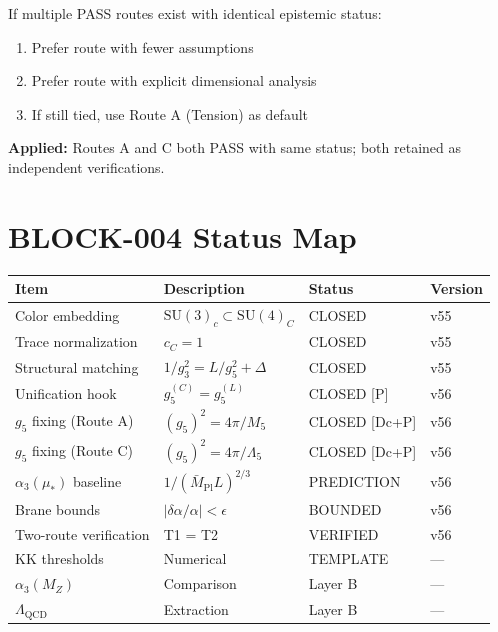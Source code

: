 \documentclass[11pt,a4paper]{article}
\theoremstyle{definition}
\begin{document}
If multiple PASS routes exist with identical epistemic status:
\begin{enumerate}
  \item Prefer route with fewer assumptions
  \item Prefer route with explicit dimensional analysis
  \item If still tied, use Route A (Tension) as default
\end{enumerate}

\textbf{Applied:} Routes A and C both PASS with same status; both retained as
independent verifications.

\section{BLOCK-004 Status Map}
\label{sec:status-map}

\begin{statusbox}
\begin{tabular}{llll}
\toprule
Item & Description & Status & Version \\
\midrule
Color embedding & $\text{SU}(3)_c \subset \text{SU}(4)_C$ & CLOSED & v55 \\
Trace normalization & $c_C = 1$ & CLOSED & v55 \\
Structural matching & $1/g_3^2 = L/g_5^2 + \Delta$ & CLOSED & v55 \\
Unification hook & $g_5^{(C)} = g_5^{(L)}$ & CLOSED [P] & v56 \\
$g_5$ fixing (Route A) & $(g_5)^2 = 4\pi/M_5$ & CLOSED [Dc+P] & v56 \\
$g_5$ fixing (Route C) & $(g_5)^2 = 4\pi/\Lambda_5$ & CLOSED [Dc+P] & v56 \\
$\alpha_3(\mu_*)$ baseline & $1/(\bar{M}_{\text{Pl}} L)^{2/3}$ & PREDICTION & v56 \\
Brane bounds & $|\delta\alpha/\alpha| < \epsilon$ & BOUNDED & v56 \\
Two-route verification & T1 = T2 & VERIFIED & v56 \\
\midrule
KK thresholds & Numerical & TEMPLATE & --- \\
$\alpha_3(M_Z)$ & Comparison & Layer B & --- \\
$\Lambda_{\text{QCD}}$ & Extraction & Layer B & --- \\
\bottomrule
\end{tabular}
\end{statusbox}
\end{document}
